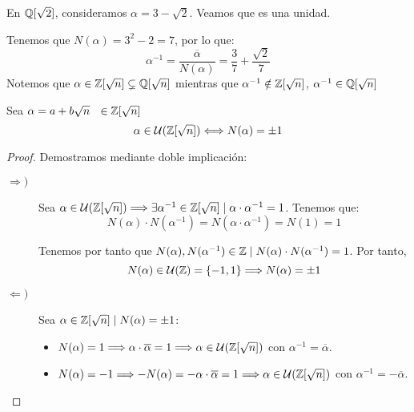 \begin{ejemplo}
    En $\mathbb Q[\sqrt{2}]$, consideramos $\alpha = 3-\sqrt{2}$. Veamos que es una unidad.
    
    Tenemos que $N(\alpha) = 3^2 - 2 = 7$, por lo que:
    $$\alpha^{-1} = \dfrac{\overline{\alpha}}{N(\alpha)} = \dfrac{3}{7} + \dfrac{\sqrt{2}}{7}$$
    Notemos que $\alpha \in \mathbb Z[\sqrt{n}] \subsetneq \mathbb Q[\sqrt{n}]$ mientras que $\alpha^{-1} \notin \mathbb Z[\sqrt{n}]$, $\alpha^{-1} \in \mathbb Q[\sqrt{n}]$
\end{ejemplo}

\begin{prop}
    Sea $\alpha = a+b\sqrt{n} ~~\in \mathbb Z[\sqrt{n}]$
    $$\alpha \in \mathcal{U}(\mathbb Z[\sqrt{n}]) \Longleftrightarrow N(\alpha) = \pm 1$$
\end{prop}
\begin{proof} Demostramos mediante doble implicación:
\begin{description}
    \item[$\Longrightarrow)$] Sea $\alpha \in \mathcal{U}(\mathbb Z[\sqrt{n}]) \Longrightarrow \exists \alpha^{-1} \in \mathbb Z[\sqrt{n}] \mid \alpha \cdot \alpha^{-1} = 1$. Tenemos que:
    $$N(\alpha) \cdot N(\alpha^{-1}) = N(\alpha \cdot \alpha^{-1}) = N(1) = 1$$

    Tenemos por tanto que $N(\alpha), N(\alpha^{-1}) \in \mathbb Z \mid N(\alpha)\cdot N(\alpha^{-1}) = 1$. Por tanto,
    $$N(\alpha) \in \mathcal{U}(\mathbb Z) = \{-1, 1\} \Longrightarrow N(\alpha) = \pm 1$$

    \item[$\Longleftarrow)$] Sea $\alpha \in \mathbb Z[\sqrt{n}] \mid N(\alpha) = \pm 1$:
    \begin{itemize}
        \item $N(\alpha) = 1 \Longrightarrow \alpha \cdot \overline{\alpha} = 1 \Longrightarrow \alpha \in \mathcal{U}(\mathbb Z[\sqrt{n}])$ con $\alpha^{-1} = \overline{\alpha}$.

        \item $N(\alpha) = -1 \Longrightarrow -N(\alpha) = -\alpha \cdot \overline{\alpha} = 1 \Longrightarrow \alpha \in \mathcal{U}(\mathbb Z[\sqrt{n}])$ con $\alpha^{-1} =-\overline{\alpha}$.
    \end{itemize}
\end{description}
\end{proof}

